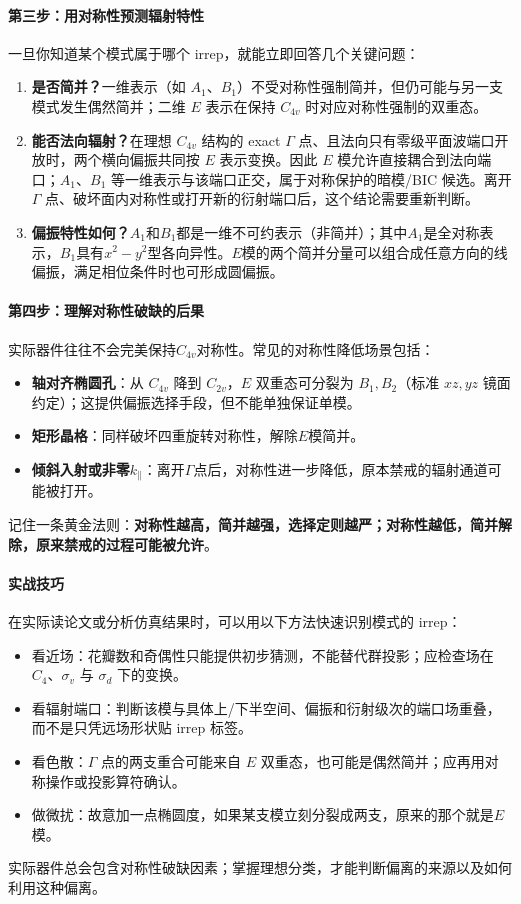 \begin{SymmetryQuick}
\paragraph{第三步：用对称性预测辐射特性}
一旦你知道某个模式属于哪个 irrep，就能立即回答几个关键问题：
\begin{enumerate}
  \item \textbf{是否简并？}一维表示（如 $A_1$、$B_1$）不受对称性强制简并，但仍可能与另一支模式发生偶然简并；二维 $E$ 表示在保持 $C_{4v}$ 时对应对称性强制的双重态。
  \item \textbf{能否法向辐射？}在理想 $C_{4v}$ 结构的 exact $\Gamma$ 点、且法向只有零级平面波端口开放时，两个横向偏振共同按 $E$ 表示变换。因此 $E$ 模允许直接耦合到法向端口；$A_1$、$B_1$ 等一维表示与该端口正交，属于对称保护的暗模/BIC 候选。离开 $\Gamma$ 点、破坏面内对称性或打开新的衍射端口后，这个结论需要重新判断。
  \item \textbf{偏振特性如何？}$A_1$和$B_1$都是一维不可约表示（非简并）；其中$A_1$是全对称表示，$B_1$具有$x^2-y^2$型各向异性。$E$模的两个简并分量可以组合成任意方向的线偏振，满足相位条件时也可形成圆偏振。
\end{enumerate}

\paragraph{第四步：理解对称性破缺的后果}
实际器件往往不会完美保持$C_{4v}$对称性。常见的对称性降低场景包括：
\begin{itemize}
  \item \textbf{轴对齐椭圆孔}：从 $C_{4v}$ 降到 $C_{2v}$，$E$ 双重态可分裂为 $B_1,B_2$（标准 $xz,yz$ 镜面约定）；这提供偏振选择手段，但不能单独保证单模。
  \item \textbf{矩形晶格}：同样破坏四重旋转对称性，解除$E$模简并。
  \item \textbf{倾斜入射或非零$k_{\parallel}$}：离开$\Gamma$点后，对称性进一步降低，原本禁戒的辐射通道可能被打开。
\end{itemize}
记住一条黄金法则：\textbf{对称性越高，简并越强，选择定则越严；对称性越低，简并解除，原来禁戒的过程可能被允许}。

\paragraph{实战技巧}
在实际读论文或分析仿真结果时，可以用以下方法快速识别模式的 irrep：
\begin{itemize}
  \item 看近场：花瓣数和奇偶性只能提供初步猜测，不能替代群投影；应检查场在 $C_4$、$\sigma_v$ 与 $\sigma_d$ 下的变换。
  \item 看辐射端口：判断该模与具体上/下半空间、偏振和衍射级次的端口场重叠，而不是只凭远场形状贴 irrep 标签。
  \item 看色散：$\Gamma$ 点的两支重合可能来自 $E$ 双重态，也可能是偶然简并；应再用对称操作或投影算符确认。
  \item 做微扰：故意加一点椭圆度，如果某支模立刻分裂成两支，原来的那个就是$E$模。
\end{itemize}
实际器件总会包含对称性破缺因素；掌握理想分类，才能判断偏离的来源以及如何利用这种偏离。
\end{SymmetryQuick}

